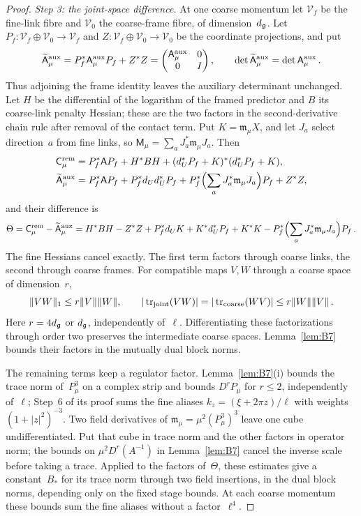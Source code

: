 \begin{proof}
\emph{Step 3: the joint-space difference.} At one coarse momentum let $\mathcal V_f$ be the fine-link fibre and $\mathcal V_0$ the coarse-frame fibre, of dimension~$d_{\mathfrak{g}}$. Let $P_f:\mathcal V_f\oplus\mathcal V_0\to\mathcal V_f$ and $Z:\mathcal V_f\oplus\mathcal V_0\to\mathcal V_0$ be the coordinate projections, and put
\begin{equation*}
\widetilde{\mathsf A}^{\rm aux}_\mu=P_f^*\mathsf A^{\rm aux}_\mu P_f+Z^*Z=
\begin{pmatrix}\mathsf A^{\rm aux}_\mu&0\\0&I\end{pmatrix},\qquad
\det\widetilde{\mathsf A}^{\rm aux}_\mu=\det\mathsf A^{\rm aux}_\mu\,.
\end{equation*}
Thus adjoining the frame identity leaves the auxiliary determinant unchanged. Let $H$ be the differential of the logarithm of the framed predictor and $B$ its coarse-link penalty Hessian; these are the two factors in the second-derivative chain rule after removal of the contact term. Put $K=\mathfrak m_\mu X$, and let $J_a$ select direction~$a$ from fine links, so $\mathsf M_\mu=\sum_aJ_a^*\mathfrak m_\mu J_a$. Then
\begin{align*}
\mathsf C^{\rm rem}_\mu&=P_f^*\mathsf AP_f+H^*BH+(d_U^*P_f+K)^*(d_U^*P_f+K),\\
\widetilde{\mathsf A}^{\rm aux}_\mu&=P_f^*\mathsf AP_f+P_f^*d_Ud_U^*P_f+
 P_f^*\Bigl(\sum_aJ_a^*\mathfrak m_\mu J_a\Bigr)P_f+Z^*Z,
\end{align*}
and their difference is
\begin{equation*}
\Theta=\mathsf C^{\rm rem}_\mu-\widetilde{\mathsf A}^{\rm aux}_\mu
=H^*BH-Z^*Z+P_f^*d_UK+K^*d_U^*P_f+K^*K
-P_f^*\Bigl(\sum_aJ_a^*\mathfrak m_\mu J_a\Bigr)P_f\,.
\end{equation*}
The fine Hessians cancel exactly. The first term factors through coarse links, the second through coarse frames. For compatible maps $V,W$ through a coarse space of dimension~$r$,
\begin{equation*}
\|VW\|_1\le r\|V\|\|W\|,\qquad
|\operatorname{tr}_{\rm joint}(VW)|=|\operatorname{tr}_{\rm coarse}(WV)|\le r\|W\|\|V\|\,.
\end{equation*}
Here $r=4d_{\mathfrak{g}}$ or $d_{\mathfrak{g}}$, independently of~$\ell$. Differentiating these factorizations through order two preserves the intermediate coarse spaces. Lemma~\ref{lem:B7} bounds their factors in the mutually dual block norms.

The remaining terms keep a regulator factor. Lemma~\ref{lem:B7}(i) bounds the trace norm of~$P_\mu^3$ on a complex strip and bounds $D^rP_\mu$ for $r\le2$, independently of~$\ell$; Step~6 of its proof sums the fine aliases $k_z=(\xi+2\pi z)/\ell$ with weights $(1+|z|^2)^{-3}$. Two field derivatives of $\mathfrak m_\mu=\mu^2(P_\mu^3)^3$ leave one cube undifferentiated. Put that cube in trace norm and the other factors in operator norm; the bounds on $\mu^2D^r(A^{-1})$ in Lemma~\ref{lem:B7} cancel the inverse scale before taking a trace. Applied to the factors of~$\Theta$, these estimates give a constant~$B_*$ for its trace norm through two field insertions, in the dual block norms, depending only on the fixed stage bounds. At each coarse momentum these bounds sum the fine aliases without a factor~$\ell^4$.


\end{proof}
